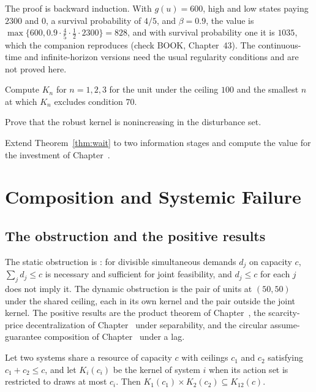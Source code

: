 The proof is backward induction. With $g(u)=600$, high and low states paying $2300$ and $0$, a survival probability of $4/5$, and $\beta=0.9$, the value is $\max\{600,0.9\cdot\tfrac45\cdot\tfrac12\cdot 2300\}=828$, and with survival probability one it is $1035$, which the companion reproduces (check BOOK, Chapter~43). The continuous-time and infinite-horizon versions need the usual regularity conditions and are not proved here.

\begin{exercise}
Compute $K_n$ for $n=1,2,3$ for the unit under the ceiling $100$ and the smallest $n$ at which $K_n$ excludes condition $70$.
\end{exercise}
\begin{exercise}
Prove that the robust kernel is nonincreasing in the disturbance set.
\end{exercise}
\begin{exercise}
Extend Theorem~\ref{thm:wait} to two information stages and compute the value for the investment of Chapter~.
\end{exercise}

\chapter{Composition and Systemic Failure}\label{ch:44}

\section{The obstruction and the positive results}

The static obstruction is : for divisible simultaneous demands $d_j$ on capacity $c$, $\sum_jd_j\le c$ is necessary and sufficient for joint feasibility, and $d_j\le c$ for each $j$ does not imply it. The dynamic obstruction is the pair of units at $(50,50)$ under the shared ceiling, each in its own kernel and the pair outside the joint kernel. The positive results are the product theorem of Chapter~, the scarcity-price decentralization of Chapter~ under separability, and the circular assume-guarantee composition of Chapter~ under a lag.

\begin{proposition}\label{prop:shares}
Let two systems share a resource of capacity $c$ with ceilings $c_1$ and $c_2$ satisfying $c_1+c_2\le c$, and let $K_i(c_i)$ be the kernel of system $i$ when its action set is restricted to draws at most $c_i$. Then $K_1(c_1)\times K_2(c_2)\subseteq K_{12}(c)$.
\end{proposition}

